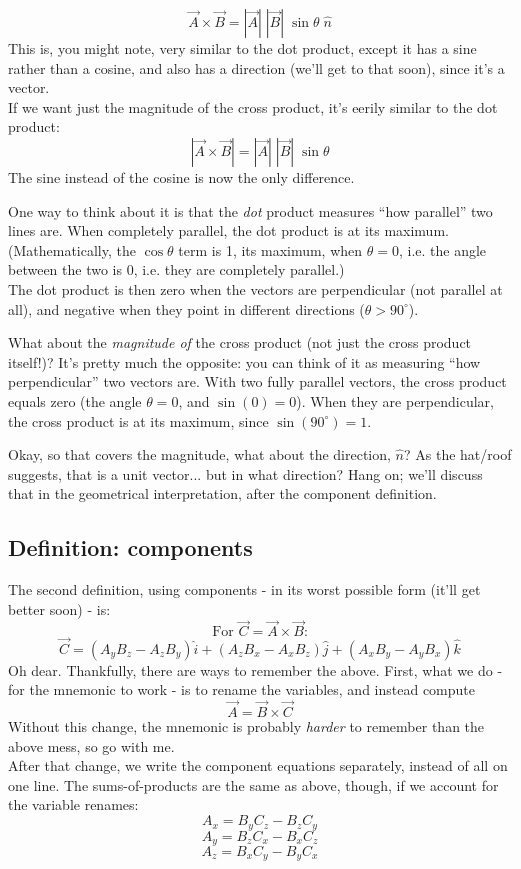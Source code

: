 \documentclass[8.01x]{subfiles}
\begin{document}
\[ \vec{A} \times \vec{B} = |\vec{A}| \; |\vec{B}| \; \sin{\theta} \; \hat{n} \]
This is, you might note, very similar to the dot product, except it has a sine rather than a cosine, and also has a direction (we'll get to that soon), since it's a vector.\\
If we want just the magnitude of the cross product, it's eerily similar to the dot product:
\[ |\vec{A} \times \vec{B}| = |\vec{A}| \; |\vec{B}| \; \sin{\theta} \]
The sine instead of the cosine is now the only difference.

One way to think about it is that the \emph{dot} product measures ``how parallel'' two lines are. When completely parallel, the dot product is at its maximum. (Mathematically, the $\cos{\theta}$ term is 1, its maximum, when $\theta = 0$, i.e. the angle between the two is 0, i.e. they are completely parallel.)\\
The dot product is then zero when the vectors are perpendicular (not parallel at all), and negative when they point in different directions ($\theta > 90^\circ$).

What about the \emph{magnitude of} the cross product (not just the cross product itself!)? It's pretty much the opposite: you can think of it as measuring ``how perpendicular'' two vectors are. With two fully parallel vectors, the cross product equals zero (the angle $\theta = 0$, and $\sin{(0)} = 0$). When they are perpendicular, the cross product is at its maximum, since $\sin{(90^\circ)} = 1$.

Okay, so that covers the magnitude, what about the direction, $\hat{n}$? As the hat/roof suggests, that is a unit vector... but in what direction? Hang on; we'll discuss that in the geometrical interpretation, after the component definition.

\subsection{Definition: components}

The second definition, using components - in its worst possible form (it'll get better soon) - is:
\[ \text{For } \vec{C} = \vec{A} \times \vec{B}\text{:} \]
\[ \vec{C} = (A_y B_z - A_z B_y) \hat{i} + (A_z B_x - A_x B_z) \hat{j} + (A_x B_y - A_y B_x) \hat{k} \]
Oh dear. Thankfully, there are ways to remember the above. First, what we do - for the mnemonic to work - is to rename the variables, and instead compute
\[ \vec{A} = \vec{B} \times \vec{C} \]
Without this change, the mnemonic is probably \emph{harder} to remember than the above mess, so go with me.\\
After that change, we write the component equations separately, instead of all on one line. The sums-of-products are the same as above, though, if we account for the variable renames:
\[ A_x = B_y C_z - B_z C_y \]
\[ A_y = B_z C_x - B_x C_z \]
\[ A_z = B_x C_y - B_y C_x \]
\end{document}
